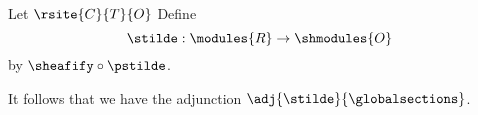 \begin{definition}
Let $\rsite{C}{T}{O}$
Define
\[\stilde: \modules{R} \rightarrow \shmodules{O}\]
by
$\sheafify \circ \pstilde$.

It follows that we have the adjunction $\adj{\stilde}{\globalsections}$.
\end{definition}













